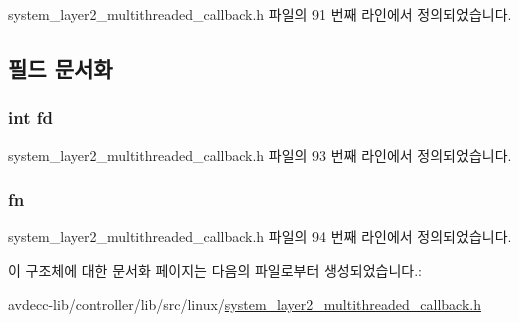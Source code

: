 system\+\_\+layer2\+\_\+multithreaded\+\_\+callback.\+h 파일의 91 번째 라인에서 정의되었습니다.



\subsection{필드 문서화}
\subsubsection[{\texorpdfstring{fd}{fd}}]{\setlength{\rightskip}{0pt plus 5cm}int fd}\hypertarget{structavdecc__lib_1_1system__layer2__multithreaded__callback_1_1epoll__priv_a6f8059414f0228f0256115e024eeed4b}{}\label{structavdecc__lib_1_1system__layer2__multithreaded__callback_1_1epoll__priv_a6f8059414f0228f0256115e024eeed4b}


system\+\_\+layer2\+\_\+multithreaded\+\_\+callback.\+h 파일의 93 번째 라인에서 정의되었습니다.

\subsubsection[{\texorpdfstring{fn}{fn}}]{ fn}\hypertarget{structavdecc__lib_1_1system__layer2__multithreaded__callback_1_1epoll__priv_ad4c759f5c520fa14ebae42bb93f0091b}{}\label{structavdecc__lib_1_1system__layer2__multithreaded__callback_1_1epoll__priv_ad4c759f5c520fa14ebae42bb93f0091b}


system\+\_\+layer2\+\_\+multithreaded\+\_\+callback.\+h 파일의 94 번째 라인에서 정의되었습니다.



이 구조체에 대한 문서화 페이지는 다음의 파일로부터 생성되었습니다.\+:\begin{DoxyCompactItemize}
\item 
avdecc-\/lib/controller/lib/src/linux/\hyperlink{linux_2system__layer2__multithreaded__callback_8h}{system\+\_\+layer2\+\_\+multithreaded\+\_\+callback.\+h}\end{DoxyCompactItemize}
